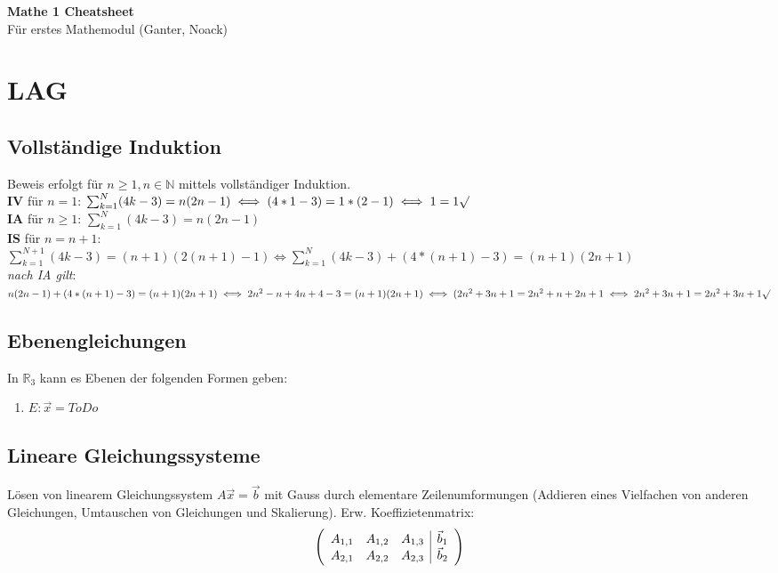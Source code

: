 \documentclass[12pt,landscape]{article}
\begin{document}
\footnotesize
\begin{multicols}{3}

\begin{center}
     \Large{\textbf{Mathe 1 Cheatsheet}} \\
     \small{Für erstes Mathemodul (Ganter, Noack)}
\end{center}

\section{LAG}
\subsection{Vollständige Induktion}
Beweis erfolgt für $n \geq 1, n \in{\mathbb{N}}$ mittels vollständiger Induktion.\\
\textbf{IV} für $n = 1$: $\sum_{k=1}^N(4k-3) = n(2n - 1) \iff (4*1-3) = 1*(2-1) \iff 1 = 1 \surd$ \\
\textbf{IA} für $n \geq 1$: $\sum_{k=1}^N(4k-3) = n(2n-1)$\\
\textbf{IS} für $n = n + 1:$\\
$\sum_{k=1}^{N+1}(4k-3) = (n+1)(2(n+1)-1) \iff \sum_{k=1}^{N}(4k-3) + (4*(n+1)-3) = (n+1)(2n+1)$\\
\textit{nach IA gilt}:\\
$n(2n-1)+(4*(n+1)-3)=(n+1)(2n+1)\iff
2n^2-n+4n+4-3=(n+1)(2n+1) \iff
(2n^2+3n+1 = 2n^2 + n + 2n + 1 \iff 2n^2 + 3n + 1 = 2n^2 + 3n + 1 \surd$
\subsection{Ebenengleichungen}
In $\mathbb{R}_3$ kann es Ebenen der folgenden Formen geben:
\begin{enumerate}
\item $E: \vec{x} = ToDo$
\end{enumerate}
\subsection{Lineare Gleichungssysteme}
Lösen von linearem Gleichungssystem $A\vec{x}=\vec{b}$ mit Gauss durch elementare Zeilenumformungen (Addieren eines Vielfachen von anderen Gleichungen, Umtauschen von Gleichungen und Skalierung). Erw. Koeffizietenmatrix:
\[\begin{array}({ccc|c})
  A_{1,1} & A_{1,2} & A_{1,3} & \vec{b}_1\\
  A_{2,1} & A_{2,2} & A_{2,3} & \vec{b}_2
\end{array}\]

\end{multicols}
\end{document}
